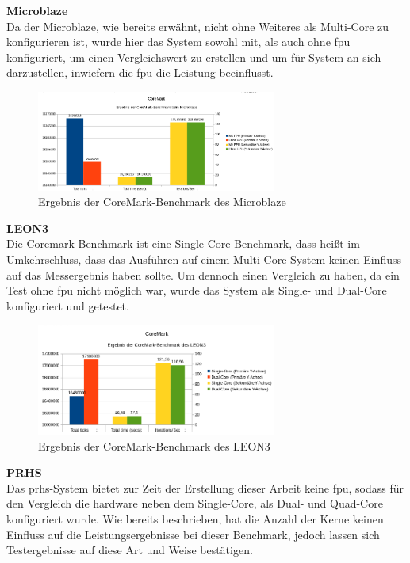 \textbf{Microblaze}\\
Da der Microblaze, wie bereits erwähnt, nicht ohne Weiteres als Multi-Core zu konfigurieren ist, wurde hier das System sowohl mit, als auch ohne \ac{fpu} konfiguriert, um einen
Vergleichswert zu erstellen und um für System an sich darzustellen, inwiefern die \ac{fpu} die Leistung beeinflusst.\\

\begin{figure}[H]
\centering
\includegraphics[width=0.7\textwidth]{Hauptteil/coremarkmb.png}
\caption{Ergebnis der CoreMark-Benchmark des Microblaze}
\label{fig:coremarkmb}
\end{figure}


\textbf{LEON3}\\
Die Coremark-Benchmark ist eine Single-Core-Benchmark, dass heißt im Umkehrschluss, dass das Ausführen auf einem Multi-Core-System keinen Einfluss auf das Messergebnis haben sollte.
Um dennoch einen Vergleich zu haben, da ein Test ohne \ac{fpu} nicht möglich war, wurde das System als Single- und Dual-Core konfiguriert und getestet.\\

\begin{figure}[H]
\centering
\includegraphics[width=0.7\textwidth]{Hauptteil/coremarkleon3.png}
\caption{Ergebnis der CoreMark-Benchmark des LEON3}
\label{fig:coremarkleon3}
\end{figure}


\textbf{PRHS}\\
Das \ac{prhs}-System bietet zur Zeit der Erstellung dieser Arbeit keine \ac{fpu}, sodass für den Vergleich die hardware neben dem Single-Core, als Dual- und Quad-Core konfiguriert wurde.
Wie bereits beschrieben, hat die Anzahl der Kerne keinen Einfluss auf die Leistungsergebnisse bei dieser Benchmark, jedoch lassen sich Testergebnisse auf diese Art und Weise bestätigen.\\

